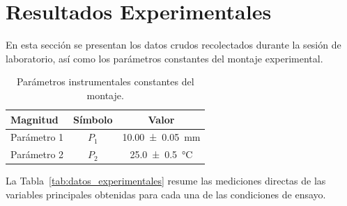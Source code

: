 
\section{Resultados Experimentales}
\label{sec:resultados}

En esta sección se presentan los datos crudos recolectados durante la sesión de laboratorio, así como los parámetros constantes del montaje experimental.

\begin{table}[H]
    \centering
    \caption{Parámetros instrumentales constantes del montaje.}
    \label{tab:parametros_constantes}
    \begin{tabular}{lcc}
        \toprule
        \textbf{Magnitud} & \textbf{Símbolo} & \textbf{Valor} \\
        \midrule
        Parámetro 1 & $P_1$ & \qty{10,00 \pm 0,05}{\milli\meter} \\
        Parámetro 2 & $P_2$ & \qty{25,0 \pm 0,5}{\celsius} \\
        \bottomrule
    \end{tabular}
\end{table}

La Tabla~\ref{tab:datos_experimentales} resume las mediciones directas de las variables principales obtenidas para cada una de las condiciones de ensayo.

\begin{table}[H]
    \centering
    \caption{Mediciones directas de las variables del experimento.}
    \label{tab:datos_experimentales}
\end{table}